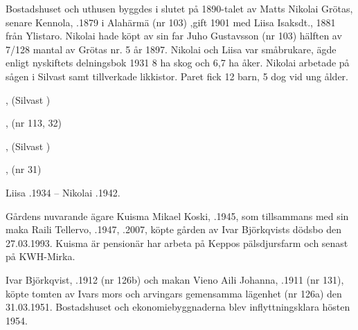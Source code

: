 Bostadshuset och uthusen byggdes i slutet på 1890-talet av Matts Nikolai Grötas, senare Kennola, .1879 i Alahärmä (nr 103) ,gift 1901 med Liisa Isaksdt.,  1881 från Ylistaro. Nikolai hade köpt av sin far Juho Gustavsson (nr 103) hälften av 7/128 mantal av Grötas nr. 5 år 1897. Nikolai och Liisa var småbrukare, ägde enligt nyskiftets delningsbok 1931 8 ha skog och 6,7 ha åker. Nikolai arbetade på sågen i Silvast samt tillverkade likkistor. Paret fick 12 barn, 5 dog vid ung ålder.
\begin{jhchildren}
  \item {}
  \item {}
  \item {}
  \item {}
  \item {}, (Silvast    )
  \item {}, (nr 113, 32)
  \item {}
  \item {}, (Silvast   )
  \item {}
  \item {}
  \item {}, (nr 31)
  \item {}
\end{jhchildren}
Liisa .1934  --  Nikolai .1942.




Gårdens nuvarande ägare Kuisma Mikael Koski, .1945, som tillsammans med sin maka Raili Tellervo, .1947, .2007, köpte gården av Ivar Björkqvists dödsbo den 27.03.1993. Kuisma är pensionär har arbeta på Keppos pälsdjursfarm och senast på KWH-Mirka.


Ivar Björkqvist, .1912 (nr 126b) och makan Vieno Aili Johanna, .1911 (nr 131), köpte tomten av Ivars mors och arvingars gemensamma lägenhet (nr 126a) den 31.03.1951. Bostadshuset och ekonomiebyggnaderna blev inflyttningsklara hösten 1954.

